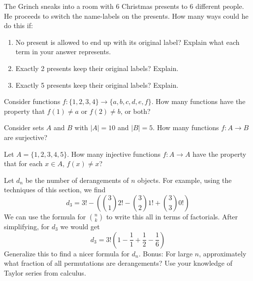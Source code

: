\documentclass[10pt,]{book}
\theoremstyle{plain}
\theoremstyle{definition}
\theoremstyle{definition}
\theoremstyle{definition}
\theoremstyle{definition}
\numberwithin{equation}{chapter}
\begin{document}
\begin{divisionexercise}{10}\hypertarget{exercise-79}{}
\hypertarget{p-940}{}%
The Grinch sneaks into a room with 6 Christmas presents to 6 different people. He proceeds to switch the name-labels on the presents. How many ways could he do this if: \leavevmode%
\begin{enumerate}[label=(\alph*)]
\item\hypertarget{li-157}{}\hypertarget{p-941}{}%
No present is allowed to end up with its original label? Explain what each term in your answer represents. %
\item\hypertarget{li-158}{}\hypertarget{p-942}{}%
Exactly 2 presents keep their original labels? Explain. %
\item\hypertarget{li-159}{}\hypertarget{p-943}{}%
Exactly 5 presents keep their original labels? Explain. %
\end{enumerate}
%
\end{divisionexercise}%
\begin{divisionexercise}{11}\hypertarget{exercise-80}{}
\hypertarget{p-944}{}%
Consider functions \(f: \{1,2,3,4\} \to \{a,b,c,d,e,f\}\). How many functions have the property that \(f(1) \ne a\) or \(f(2) \ne b\), or both?%
\end{divisionexercise}%
\begin{divisionexercise}{12}\hypertarget{exercise-81}{}
\hypertarget{p-946}{}%
Consider sets \(A\) and \(B\) with \(|A| = 10\) and \(|B| = 5\). How many functions \(f: A \to B\) are surjective?%
\end{divisionexercise}%
\begin{divisionexercise}{13}\hypertarget{exercise-82}{}
\hypertarget{p-948}{}%
Let \(A = \{1,2,3,4,5\}\). How many injective functions \(f:A \to A\) have the property that for each \(x \in A\), \(f(x) \ne x\)?%
\end{divisionexercise}%
\begin{divisionexercise}{14}\hypertarget{exercise-83}{}
\hypertarget{p-949}{}%
Let \(d_n\) be the number of derangements of \(n\) objects. For example, using the techniques of this section, we find%
\begin{equation*}
d_3 = 3!-\left({3 \choose 1}2! - {3 \choose 2}1! + {3 \choose 3}0! \right)
\end{equation*}
We can use the formula for \({n \choose k}\) to write this all in terms of factorials.  After simplifying, for \(d_3\) we would get%
\begin{equation*}
d_3 = 3!\left(1 - \frac{1}{1} + \frac{1}{2} - \frac{1}{6} \right)
\end{equation*}
Generalize this to find a nicer formula for \(d_n\).  Bonus: For large \(n\), approximately what fraction of all permutations are derangements?  Use your knowledge of Taylor series from calculus.%
\end{divisionexercise}%
\typeout{************************************************}
\typeout{************************************************}
\end{document}
